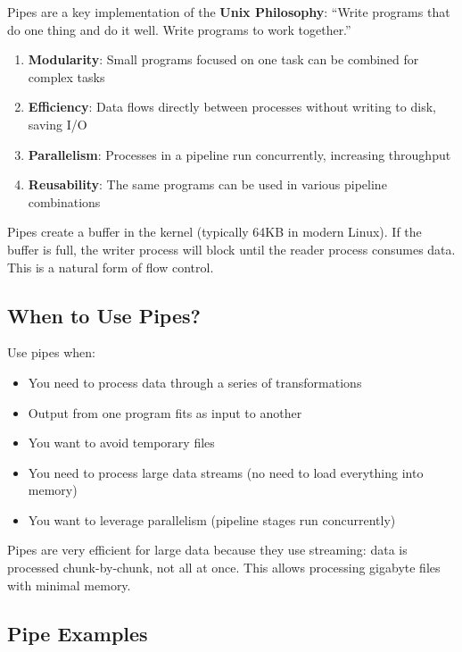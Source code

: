 Pipes are a key implementation of the \textbf{Unix Philosophy}: ``Write programs that do one thing and do it well. Write programs to work together.''

\begin{enumerate}
	\item \textbf{Modularity}: Small programs focused on one task can be combined for complex tasks
	\item \textbf{Efficiency}: Data flows directly between processes without writing to disk, saving I/O
	\item \textbf{Parallelism}: Processes in a pipeline run concurrently, increasing throughput
	\item \textbf{Reusability}: The same programs can be used in various pipeline combinations
\end{enumerate}

\begin{notebox}
	Pipes create a buffer in the kernel (typically 64KB in modern Linux). If the buffer is full, the writer process will block until the reader process consumes data. This is a natural form of flow control.
\end{notebox}

\subsection{When to Use Pipes?}

Use pipes when:

\begin{itemize}
	\item You need to process data through a series of transformations
	\item Output from one program fits as input to another
	\item You want to avoid temporary files
	\item You need to process large data streams (no need to load everything into memory)
	\item You want to leverage parallelism (pipeline stages run concurrently)
\end{itemize}

\begin{tipbox}
	Pipes are very efficient for large data because they use streaming: data is processed chunk-by-chunk, not all at once. This allows processing gigabyte files with minimal memory.
\end{tipbox}

\subsection{Pipe Examples}

